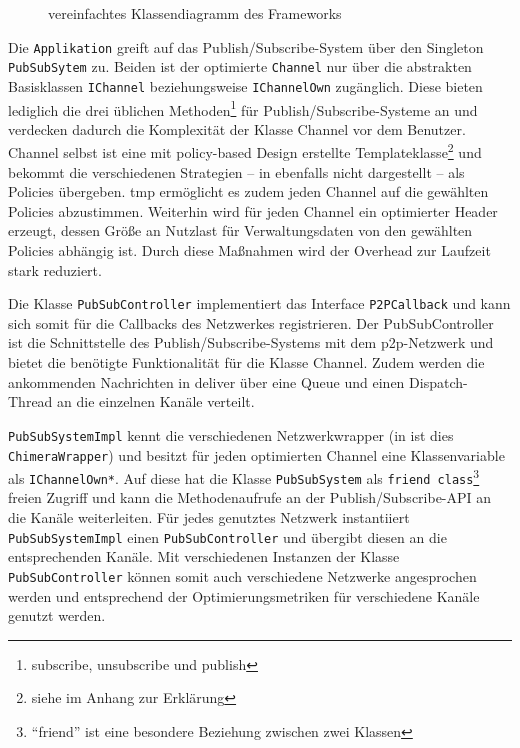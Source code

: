 \begin{figure}[htbp]
\centering
{}
\caption{vereinfachtes Klassendiagramm des Frameworks}
\label{fig:uml}
\end{figure}

Die \texttt{Applikation} greift auf das Publish/Subscribe-System über den Singleton \texttt{PubSub\-Sytem} zu. Beiden ist der optimierte \texttt{Channel} nur über die abstrakten Basisklassen \texttt{IChannel} beziehungsweise \texttt{IChannelOwn} zugänglich. Diese bieten lediglich die drei üblichen Methoden\footnote{subscribe, unsubscribe und publish} für Publish/Subscribe-Systeme an und verdecken dadurch die Komplexität der Klasse Channel vor dem Benutzer. Channel selbst ist eine mit policy-based Design erstellte Templateklasse\footnote{siehe  im Anhang zur Erklärung} und bekommt die verschiedenen Strategien -- in  ebenfalls nicht dargestellt -- als Policies übergeben. \ac{tmp} ermöglicht es zudem jeden Channel auf die gewählten Policies abzustimmen. Weiterhin wird für jeden Channel ein optimierter Header erzeugt, dessen Größe an Nutzlast für Verwaltungsdaten von den gewählten Policies abhängig ist. Durch diese Maßnahmen wird der Overhead zur Laufzeit stark reduziert. 

Die Klasse \texttt{PubSubController} implementiert das Interface \texttt{P2PCallback} und kann sich somit für die Callbacks des Netzwerkes registrieren. Der PubSubController ist die Schnittstelle des Publish/Subscribe-Systems mit dem \ac{p2p}-Netzwerk und bietet die benötigte Funktionalität für die Klasse Channel. Zudem werden die ankommenden Nachrichten in deliver über eine Queue und einen Dispatch-Thread an die einzelnen Kanäle verteilt. 

\texttt{PubSubSystemImpl} kennt die verschiedenen Netzwerkwrapper (in  ist dies \texttt{ChimeraWrapper}) und besitzt für jeden optimierten Channel eine Klassenvariable als \texttt{IChannelOwn*}. Auf diese hat die Klasse \texttt{PubSubSystem} als \texttt{friend class}\footnote{\enquote{friend} ist eine besondere Beziehung zwischen zwei Klassen} freien Zugriff und kann die Methodenaufrufe an der Publish/Subscribe-API an die Kanäle weiterleiten. Für jedes genutztes Netzwerk instantiiert \texttt{PubSubSystemImpl} einen \texttt{PubSubController} und übergibt diesen an die entsprechenden Kanäle. Mit verschiedenen Instanzen der Klasse \texttt{PubSubController} können somit auch verschiedene Netzwerke angesprochen werden und entsprechend der Optimierungsmetriken für verschiedene Kanäle genutzt werden.\\

